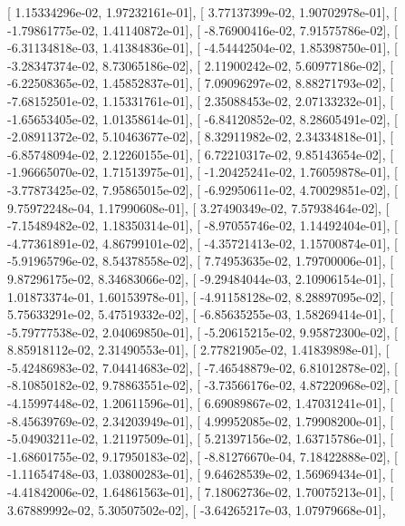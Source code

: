 \documentclass{article}
\begin{document}
       [  1.15334296e-02,   1.97232161e-01],
       [  3.77137399e-02,   1.90702978e-01],
       [ -1.79861775e-02,   1.41140872e-01],
       [ -8.76900416e-02,   7.91575786e-02],
       [ -6.31134818e-03,   1.41384836e-01],
       [ -4.54442504e-02,   1.85398750e-01],
       [ -3.28347374e-02,   8.73065186e-02],
       [  2.11900242e-02,   5.60977186e-02],
       [ -6.22508365e-02,   1.45852837e-01],
       [  7.09096297e-02,   8.88271793e-02],
       [ -7.68152501e-02,   1.15331761e-01],
       [  2.35088453e-02,   2.07133232e-01],
       [ -1.65653405e-02,   1.01358614e-01],
       [ -6.84120852e-02,   8.28605491e-02],
       [ -2.08911372e-02,   5.10463677e-02],
       [  8.32911982e-02,   2.34334818e-01],
       [ -6.85748094e-02,   2.12260155e-01],
       [  6.72210317e-02,   9.85143654e-02],
       [ -1.96665070e-02,   1.71513975e-01],
       [ -1.20425241e-02,   1.76059878e-01],
       [ -3.77873425e-02,   7.95865015e-02],
       [ -6.92950611e-02,   4.70029851e-02],
       [  9.75972248e-04,   1.17990608e-01],
       [  3.27490349e-02,   7.57938464e-02],
       [ -7.15489482e-02,   1.18350314e-01],
       [ -8.97055746e-02,   1.14492404e-01],
       [ -4.77361891e-02,   4.86799101e-02],
       [ -4.35721413e-02,   1.15700874e-01],
       [ -5.91965796e-02,   8.54378558e-02],
       [  7.74953635e-02,   1.79700006e-01],
       [  9.87296175e-02,   8.34683066e-02],
       [ -9.29484044e-03,   2.10906154e-01],
       [  1.01873374e-01,   1.60153978e-01],
       [ -4.91158128e-02,   8.28897095e-02],
       [  5.75633291e-02,   5.47519332e-02],
       [ -6.85635255e-03,   1.58269414e-01],
       [ -5.79777538e-02,   2.04069850e-01],
       [ -5.20615215e-02,   9.95872300e-02],
       [  8.85918112e-02,   2.31490553e-01],
       [  2.77821905e-02,   1.41839898e-01],
       [ -5.42486983e-02,   7.04414683e-02],
       [ -7.46548879e-02,   6.81012878e-02],
       [ -8.10850182e-02,   9.78863551e-02],
       [ -3.73566176e-02,   4.87220968e-02],
       [ -4.15997448e-02,   1.20611596e-01],
       [  6.69089867e-02,   1.47031241e-01],
       [ -8.45639769e-02,   2.34203949e-01],
       [  4.99952085e-02,   1.79908200e-01],
       [ -5.04903211e-02,   1.21197509e-01],
       [  5.21397156e-02,   1.63715786e-01],
       [ -1.68601755e-02,   9.17950183e-02],
       [ -8.81276670e-04,   7.18422888e-02],
       [ -1.11654748e-03,   1.03800283e-01],
       [  9.64628539e-02,   1.56969434e-01],
       [ -4.41842006e-02,   1.64861563e-01],
       [  7.18062736e-02,   1.70075213e-01],
       [  3.67889992e-02,   5.30507502e-02],
       [ -3.64265217e-03,   1.07979668e-01],
\end{document}
